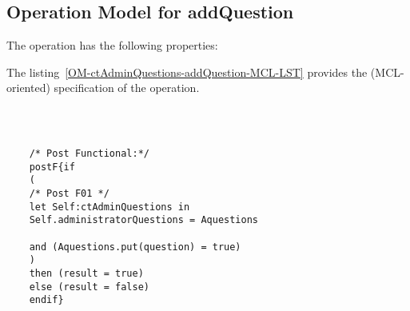 \subsection{Operation Model for addQuestion}

\label{OM-addQuestion}


The  operation has the following properties:

	\begin{operationmodel}



		


	\end{operationmodel}



	\vspace{1cm}
	The listing~\ref{OM-ctAdminQuestions-addQuestion-MCL-LST} provides the \msrmessir (MCL-oriented) specification of the operation.
	
	\scriptsize
	\vspace{0.5cm}
	\begin{lstlisting}[style=MessirStyle,firstnumber=auto,captionpos=b,caption={\msrmessir (MCL-oriented) specification of the operation \emph{addQuestion}.},label=OM-ctAdminQuestions-addQuestion-MCL-LST]

	
	
	/* Post Functional:*/ 
	postF{if
	(
	/* Post F01 */
	let Self:ctAdminQuestions in
	Self.administratorQuestions = Aquestions
	
	and (Aquestions.put(question) = true)
	)
	then (result = true)
	else (result = false)
	endif}
	
	
	\end{lstlisting}
	\normalsize 
	
	
	
	





